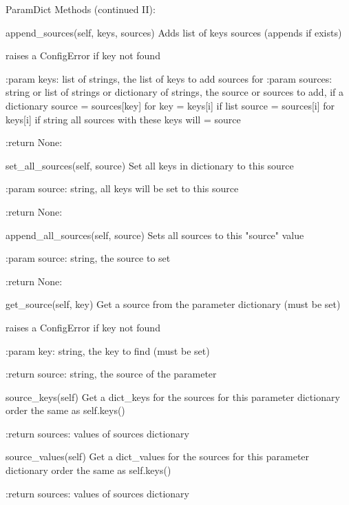\noindent\begin{minipage}{\textwidth}
\begin{pythondocstring}
ParamDict Methods (continued II):

	append_sources(self, keys, sources)
	        Adds list of keys sources (appends if exists)

	        raises a ConfigError if key not found

	        :param keys: list of strings, the list of keys to add sources for
	        :param sources: string or list of strings or dictionary of strings,
	                        the source or sources to add,
	                        if a dictionary source = sources[key] for key = keys[i]
	                        if list source = sources[i]  for keys[i]
	                        if string all sources with these keys will = source

	        :return None:

	set_all_sources(self, source)
	        Set all keys in dictionary to this source

	        :param source: string, all keys will be set to this source

	        :return None:

	append_all_sources(self, source)
	        Sets all sources to this "source" value

	        :param source: string, the source to set

	        :return None:

	get_source(self, key)
	        Get a source from the parameter dictionary (must be set)

	        raises a ConfigError if key not found

	        :param key: string, the key to find (must be set)

	        :return source: string, the source of the parameter

	source_keys(self)
	        Get a dict_keys for the sources for this parameter dictionary
	        order the same as self.keys()

	        :return sources: values of sources dictionary

	source_values(self)
	        Get a dict_values for the sources for this parameter dictionary
	        order the same as self.keys()

	        :return sources: values of sources dictionary
\end{pythondocstring}
\end{minipage}

